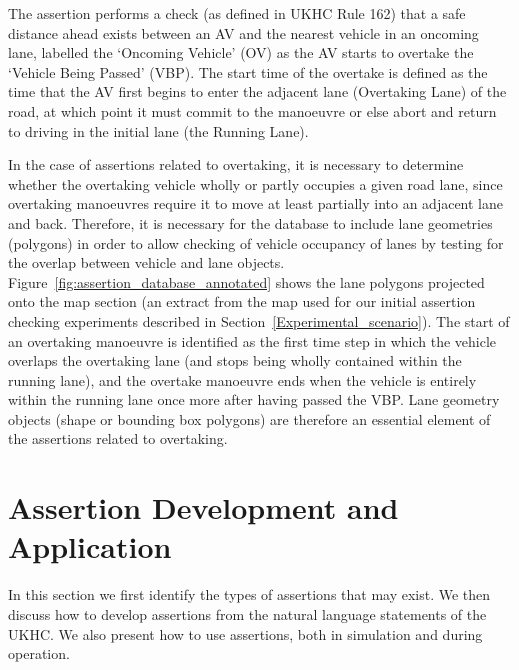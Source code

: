 The assertion performs a check (as defined in UKHC Rule 162) that a safe distance ahead exists between an AV and the nearest vehicle in an oncoming lane, labelled the `Oncoming Vehicle' (OV) as the AV starts to overtake the `Vehicle Being Passed' (VBP). The start time of the overtake is defined as the time that the AV first begins to enter the adjacent lane (Overtaking Lane) of the road, at which point it must commit to the manoeuvre or else abort and return to driving in the initial lane (the Running Lane).

In the case of assertions related to overtaking, it is necessary to determine whether the overtaking vehicle wholly or partly occupies a given road lane, since overtaking manoeuvres require it to move at least partially into an adjacent lane and back. Therefore, it is necessary for the database to include lane geometries (polygons) in order to allow checking of vehicle occupancy of lanes by testing for the overlap between vehicle and lane objects. Figure~\ref{fig:assertion_database_annotated} shows the lane polygons projected onto the map section (an extract from the map used for our initial assertion checking experiments described in Section~\ref{Experimental_scenario}). The start of an overtaking manoeuvre is identified as the first time step in which the vehicle overlaps the overtaking lane (and stops being wholly contained within the running lane), and the overtake manoeuvre ends when the vehicle is entirely within the running lane once more after having passed the VBP. Lane geometry objects (shape or bounding box polygons) are therefore an essential element of the assertions related to overtaking.











\section{Assertion Development and Application}\label{Use_of_assertions}
In this section we first identify the types of assertions that may exist. We then discuss how to develop assertions from the natural language statements of the UKHC. We also present how to use assertions, both in simulation and during operation.

